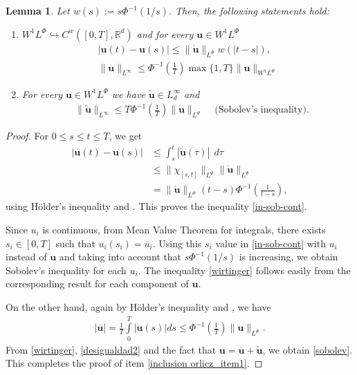\documentclass[twoside]{article}
\newtheorem{lem}[thm]{Lemma}
\theoremstyle{remark}
\newcommand{\orlnor}{\|_{L^{\Phi}}}
\newcommand{\lphi}{L^{\Phi}}
\newcommand{\lpsi}{L^{\Psi}}
\newcommand{\wphi}{W^{1}\lphi}
\newcommand{\sobnor}{\|_{W^{1}\lphi}}
\renewcommand{\b}[1]{\boldsymbol{#1}}
\newcommand{\rr}{\mathbb{R}}
\renewcommand{\leq}{\leqslant}
\begin{document}
\begin{lem}\label{inclusion orlicz} Let  $w(s):= s\Phi^{-1}(1/s)$. Then, the following statements hold:
\begin{enumerate}
\item\label{inclusion orlicz_item1} $\wphi\hookrightarrow C^w([0,T],\rr^d) $ and for every $\b{u}\in\wphi$
\begin{align}
 &\left|\b{u}(t)-\b{u}(s) \right| \leq  \|\b{\dot{u}}\orlnor w(| t-s|),&\label{in-sob-cont}
\\
& \|\b{u}\|_{L^{\infty}} \leq\Phi^{-1}\left(\frac{1}{T}\right)\max\{1,T\}\|\b{u}\sobnor&\label{sobolev}
\end{align}
\item For every $\b{u}\in\wphi$ we have $\widetilde{\b{u}}\in L^{\infty}_d$ and 
\begin{align}
& \|\widetilde{\b{u}}\|_{L^{\infty}} \leq T\Phi^{-1}\left(\frac{1}{T}\right)\|\b{\dot u}\orlnor&\text{  (Sobolev's inequality).}\label{wirtinger}
\end{align}




\end{enumerate}
\end{lem}

\begin{proof}
For $0 \leq
s\leq t \leq T $, we get
\begin{equation}\label{equicont}
\begin{split}
\left|\b{u}(t)-\b{u}(s) \right| &\leq \int_{s}^t \left| \b{\dot{u}}(\tau)\right|\ \ d\tau\\
&\leq \| \chi_{[s,t]}\|_{\lpsi}\|\b{\dot{u}}\|_{\lphi}\\
&= \|\b{\dot{u}}\|_{\lphi} ( t-s)\Phi^{-1}\left(\frac{1}{t-s}\right),
\end{split}
\end{equation}
using H\"older's inequality and \cite[Eq. (9.11)]{KR}.
This proves the inequality \eqref{in-sob-cont}.

Since $u_i$ is continuous, from Mean Value Theorem for integrals, 
there exists  $s_i\in [0,T]$ such that $u_i(s_i)=\overline{u}_i$.
Using this $s_i$ value in \eqref{in-sob-cont} with $u_i$ instead of $\b{u}$ and taking into account that $s\Phi^{-1}(1/s)$ is increasing, 
we obtain  Sobolev's inequality for each $u_i$. The inequality \eqref{wirtinger} 
follows easily from the corresponding result for each component of $\b{u}$.

On the other hand, again by H\"older's inequality and \cite[Eq. (9.11)]{KR}, we have
\begin{equation}\label{desigualdad2}\begin{split}
|\overline{\b{u}}|= \frac{1}{T}\int\limits_{0}^{T}|\b{u}(s)|ds\leq \Phi^{-1}\left(\frac{1}{T}\right)\|\b{u}\orlnor.
\end{split}
\end{equation}
From \eqref{wirtinger}, \eqref{desigualdad2} and the fact that $\b{u}=\overline{\b{u}}+\widetilde{\b{u}}$,  we obtain \eqref{sobolev}. This completes the proof of item \ref{inclusion orlicz_item1}.
\end{proof}
\end{document}
